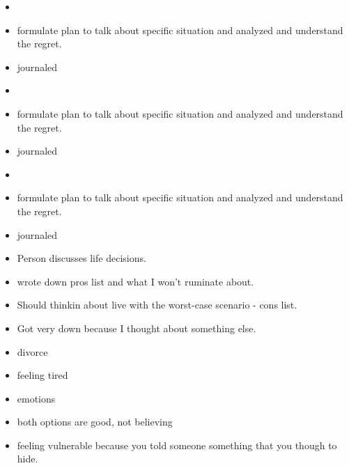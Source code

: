 \documentclass[11pt]{article}
\begin{document}
{ 
\begin{itemize}
\item \tiny 
\tiny \item \tiny formulate plan to talk about specific situation and
analyzed and understand the regret. 
\item \tiny journaled 
\end{itemize}

\begin{itemize}
\item \tiny 
\tiny \item \tiny formulate plan to talk about specific situation and
analyzed and understand the regret. 
\item \tiny journaled 
\end{itemize}

\begin{itemize}
\item \tiny 
\tiny \item \tiny formulate plan to talk about specific situation and
analyzed and understand the regret. 
\item \tiny journaled 
\end{itemize}




\begin{itemize}
\tiny \item \tiny Person discusses life decisions. 

\item \tiny wrote down pros  list and what I won't ruminate about. 
\item \tiny Should thinkin about live with the worst-case scenario -
  cons list. 
\item \tiny Got very down because I thought about something else. 




\item \tiny divorce 
\item \tiny feeling tired 

\item \tiny emotions 
\item \tiny both options are good, not believing  

\item \tiny feeling vulnerable because you told someone something that
  you though to hide. 


\end{itemize}



}
\end{document}
